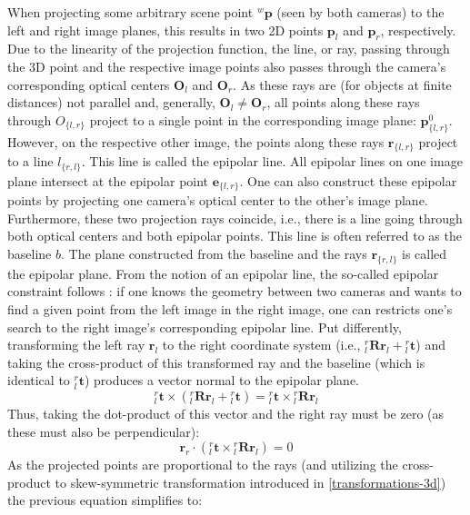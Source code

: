 \documentclass[headsepline, hidelinks, footsepline, footinclude=false, oneside, fontsize=11pt, paper=a4, listof=totoc, bibliography=totoc]{scrbook}
\begin{document}
When projecting some arbitrary scene point \({}^w\mathbf{p}\) (seen by both cameras) to the left and right image planes, this results in two 2D points 
\(\mathbf{p}_l\) and \(\mathbf{p}_r\), respectively. Due to the linearity of the projection function, the line, or ray, passing through the 3D point and the
respective image points also passes through the camera's corresponding optical centers \(\mathbf{O}_l\) and \(\mathbf{O}_r\). As these rays are (for objects at finite distances)
not parallel and, generally, \(\mathbf{O}_l \neq \mathbf{O}_r\), all points along these rays through \(O_{\{l, r\}}\) project to a single point in the corresponding image plane: \(\mathbf{p}^0_{\{l, r\}}\). 
However, on the respective other image, the points along these rays \(\mathbf{r}_{\{l, r\}}\) project to a line \(l_{\{r, l\}}\). This line is called the epipolar line. 
All epipolar lines on one image plane intersect at the epipolar point \(\mathbf{e}_{\{l, r\}}\). One can also construct these epipolar points by projecting one camera's optical center to the other's image plane. Furthermore, these two projection rays coincide, i.e., there is a line going through both optical centers and both epipolar points.
This line is often referred to as the baseline \(b\). The plane constructed from the baseline and the rays \(\mathbf{r}_{\{r, l\}}\) is called the epipolar plane.
From the notion of an epipolar line, the so-called epipolar constraint follows \cite{hartleyMultipleViewGeometry2004}: 
if one knows the geometry between two cameras and wants to find a given point from the left image in the right image, one can restricts one's search to the right image's corresponding epipolar line.
Put differently, transforming the left ray \(\mathbf{r}_l\) to the right coordinate system (i.e., \({}^r_l\mathbf{R}\mathbf{r}_l + {}^r_l\mathbf{t}\)) and taking the cross-product of this 
transformed ray and the baseline (which is identical to \({}^r_l\mathbf{t}\)) produces a vector normal to the epipolar plane. 
\begin{equation}
{}^r_l\mathbf{t} \times ({}^r_l\mathbf{R}\mathbf{r}_l + {}^r_l\mathbf{t}) = {}^r_l\mathbf{t} \times {}^r_l\mathbf{R}\mathbf{r}_l
\end{equation}
Thus, taking the dot-product of this vector and the right ray must be zero (as these must also be perpendicular): 
\begin{equation}
\mathbf{r}_r \cdot ({}^r_l\mathbf{t} \times {}^r_l\mathbf{R}\mathbf{r}_l) = 0
\end{equation}
As the projected points are proportional to the rays (and utilizing the cross-product to skew-symmetric transformation introduced in \cref{transformations-3d}) the previous equation simplifies to:
\end{document}
